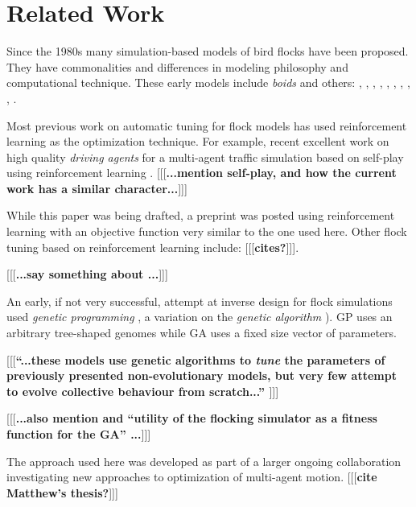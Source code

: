 \documentclass[letterpaper]{article}
\begin{document}
\section{Related Work}
\label{sec:related}

Since the 1980s many simulation-based models of bird flocks have been proposed. They have commonalities and differences in modeling philosophy and computational technique. These early models include \textit{boids} and others:
\citet{aoki_simulation_1982}, 
\citet{akira_okubo_dynamical_1986}, 
\citep{reynolds_flocks_1987},
\citet{toner_flocks_1998}, 
\citet{frank_heppner_stochastic_1990}, 
\citet{bajec_simulating_2005},
\citet{cucker_emergent_2007},
\citet{moskon_fuzzy_2007},
\citet{cavagna_seventh_2008},
\citet{bajec_organized_2009}.

Most previous work on automatic tuning for flock models has used reinforcement learning \citep{sutton_reinforcement_1998} as the optimization technique. For example, recent excellent work on high quality \textit{driving agents} for a multi-agent traffic simulation based on self-play using reinforcement learning \citep{cornelisse_building_2025}.
[[[\textbf{...mention self-play, and how the current work has a similar character...}]]]

While this paper was being drafted, a preprint was posted \citep{brambati_learning_2025} using reinforcement learning with an objective function very similar to the one used here. Other flock tuning based on reinforcement learning include:
[[[\textbf{cites?}]]].

[[[\textbf{...say something about \citep{jaderberg_human-level_2019}...}]]]

An early, if not very successful, attempt at inverse design for flock simulations \citep{reynolds_evolved_1993} used \textit{genetic programming} \citep{koza_genetic_1992}, a variation on the \textit{genetic algorithm} \citep{holland_adaptation_1975}). GP uses an arbitrary tree-shaped genomes while GA uses a fixed size vector of parameters.

[[[\textbf{``...these models use genetic algorithms to \textit{tune} the parameters of previously presented non-evolutionary models, but very few attempt to evolve collective behaviour from scratch...'' \citep{demsar_evolution_2017}}]]]

[[[\textbf{...also mention \citep{stonedahl_finding_2011} and ``utility of the flocking simulator as a fitness function for the GA'' ...}]]]

The approach used here was developed as part of a larger ongoing collaboration investigating new approaches to optimization of multi-agent motion. [[[\textbf{cite Matthew's thesis?}]]]
\end{document}

